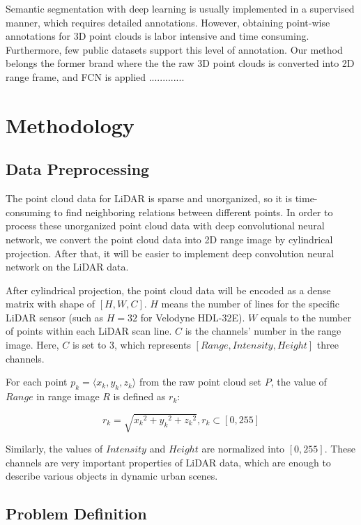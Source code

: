 	Semantic segmentation with deep learning is usually implemented in a supervised manner, which requires detailed annotations. However, obtaining point-wise annotations for 3D point clouds is labor intensive and time consuming. Furthermore, few public datasets support this level of annotation. Our method belongs the former brand where the the raw 3D point clouds is converted into 2D range frame, and FCN is applied .............

\section{Methodology}

\subsection{Data Preprocessing}
The point cloud data for LiDAR is sparse and unorganized, so it is time-consuming to find neighboring relations between different points. In order to process these unorganized point cloud data with deep convolutional neural network, we convert the point cloud data into 2D range image by cylindrical projection. After that, it will be easier to implement deep convolution neural network on the LiDAR data.

After cylindrical projection, the point cloud data will be encoded as a dense matrix with shape of $[H,W,C]$. $H$ means the number of lines for the specific LiDAR sensor (such as $H=32$ for Velodyne HDL-32E). $W$ equals to the number of points within each LiDAR scan line. $C$ is the channels' number in the range image. Here, $C$ is set to 3, which represents $[Range,Intensity,Height]$ three channels.

For each point $p_k=\langle x_k,y_k,z_k\rangle$ from the raw point cloud set $P$, the value of $Range$ in range image $R$ is defined as $r_k$:
 
\begin{equation}
r_k=\sqrt{{x_k}^2+{y_k}^2+{z_k}^2},  r_k\subset [0,255]	
\end{equation} 

Similarly, the values of $Intensity$ and $Height$ are normalized into $[0,255]$. These channels are very important properties of LiDAR data, which are enough to describe various objects in dynamic urban scenes.
 
\subsection{Problem Definition}

